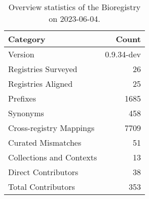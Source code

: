 \begin{table}
\caption{Overview statistics of the Bioregistry on 2023-06-04.}
\label{tab:bioregistry-summary}
\begin{tabular}{lr}
\toprule
Category & Count \\
\midrule
Version & 0.9.34-dev \\
Registries Surveyed & 26 \\
Registries Aligned & 25 \\
Prefixes & 1685 \\
Synonyms & 458 \\
Cross-registry Mappings & 7709 \\
Curated Mismatches & 51 \\
Collections and Contexts & 13 \\
Direct Contributors & 38 \\
Total Contributors & 353 \\
\bottomrule
\end{tabular}
\end{table}
